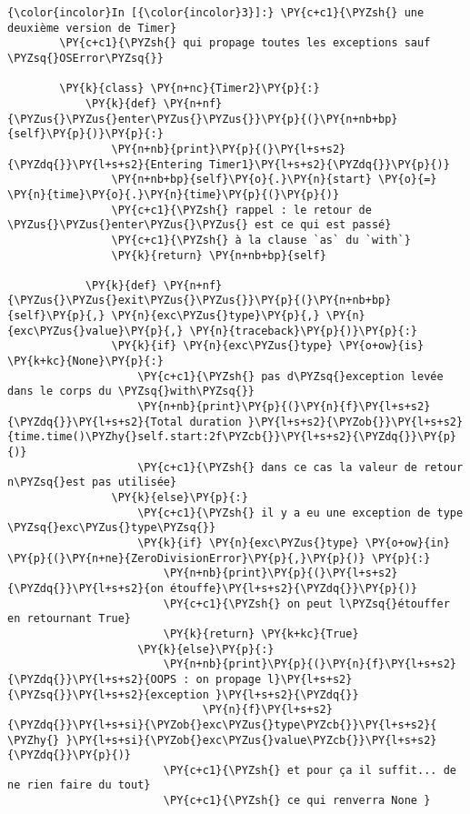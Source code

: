     \begin{Verbatim}[commandchars=\\\{\}]
{\color{incolor}In [{\color{incolor}3}]:} \PY{c+c1}{\PYZsh{} une deuxième version de Timer}
        \PY{c+c1}{\PYZsh{} qui propage toutes les exceptions sauf \PYZsq{}OSError\PYZsq{}}
        
        \PY{k}{class} \PY{n+nc}{Timer2}\PY{p}{:}
            \PY{k}{def} \PY{n+nf}{\PYZus{}\PYZus{}enter\PYZus{}\PYZus{}}\PY{p}{(}\PY{n+nb+bp}{self}\PY{p}{)}\PY{p}{:}
                \PY{n+nb}{print}\PY{p}{(}\PY{l+s+s2}{\PYZdq{}}\PY{l+s+s2}{Entering Timer1}\PY{l+s+s2}{\PYZdq{}}\PY{p}{)}
                \PY{n+nb+bp}{self}\PY{o}{.}\PY{n}{start} \PY{o}{=} \PY{n}{time}\PY{o}{.}\PY{n}{time}\PY{p}{(}\PY{p}{)}
                \PY{c+c1}{\PYZsh{} rappel : le retour de \PYZus{}\PYZus{}enter\PYZus{}\PYZus{} est ce qui est passé}
                \PY{c+c1}{\PYZsh{} à la clause `as` du `with`}
                \PY{k}{return} \PY{n+nb+bp}{self}
            
            \PY{k}{def} \PY{n+nf}{\PYZus{}\PYZus{}exit\PYZus{}\PYZus{}}\PY{p}{(}\PY{n+nb+bp}{self}\PY{p}{,} \PY{n}{exc\PYZus{}type}\PY{p}{,} \PY{n}{exc\PYZus{}value}\PY{p}{,} \PY{n}{traceback}\PY{p}{)}\PY{p}{:}
                \PY{k}{if} \PY{n}{exc\PYZus{}type} \PY{o+ow}{is} \PY{k+kc}{None}\PY{p}{:}
                    \PY{c+c1}{\PYZsh{} pas d\PYZsq{}exception levée dans le corps du \PYZsq{}with\PYZsq{}}
                    \PY{n+nb}{print}\PY{p}{(}\PY{n}{f}\PY{l+s+s2}{\PYZdq{}}\PY{l+s+s2}{Total duration }\PY{l+s+s2}{\PYZob{}}\PY{l+s+s2}{time.time()\PYZhy{}self.start:2f\PYZcb{}}\PY{l+s+s2}{\PYZdq{}}\PY{p}{)}
                    \PY{c+c1}{\PYZsh{} dans ce cas la valeur de retour n\PYZsq{}est pas utilisée}
                \PY{k}{else}\PY{p}{:}
                    \PY{c+c1}{\PYZsh{} il y a eu une exception de type \PYZsq{}exc\PYZus{}type\PYZsq{}}
                    \PY{k}{if} \PY{n}{exc\PYZus{}type} \PY{o+ow}{in} \PY{p}{(}\PY{n+ne}{ZeroDivisionError}\PY{p}{,}\PY{p}{)} \PY{p}{:}
                        \PY{n+nb}{print}\PY{p}{(}\PY{l+s+s2}{\PYZdq{}}\PY{l+s+s2}{on étouffe}\PY{l+s+s2}{\PYZdq{}}\PY{p}{)}
                        \PY{c+c1}{\PYZsh{} on peut l\PYZsq{}étouffer en retournant True}
                        \PY{k}{return} \PY{k+kc}{True}
                    \PY{k}{else}\PY{p}{:}
                        \PY{n+nb}{print}\PY{p}{(}\PY{n}{f}\PY{l+s+s2}{\PYZdq{}}\PY{l+s+s2}{OOPS : on propage l}\PY{l+s+s2}{\PYZsq{}}\PY{l+s+s2}{exception }\PY{l+s+s2}{\PYZdq{}}
                              \PY{n}{f}\PY{l+s+s2}{\PYZdq{}}\PY{l+s+si}{\PYZob{}exc\PYZus{}type\PYZcb{}}\PY{l+s+s2}{ \PYZhy{} }\PY{l+s+si}{\PYZob{}exc\PYZus{}value\PYZcb{}}\PY{l+s+s2}{\PYZdq{}}\PY{p}{)}
                        \PY{c+c1}{\PYZsh{} et pour ça il suffit... de ne rien faire du tout}
                        \PY{c+c1}{\PYZsh{} ce qui renverra None }
\end{Verbatim}


